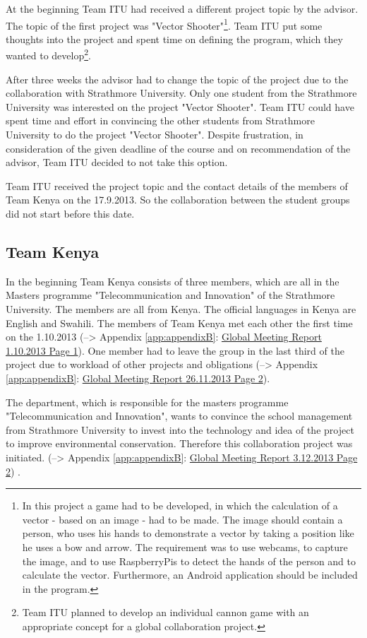 At the beginning Team ITU had received a different project topic by the advisor. The topic of the first project was "Vector Shooter"\footnote{In this project a game had to be developed, in which the calculation of a vector - based on an image - had to be made. The image should contain a person, who uses his hands to demonstrate a vector by taking a position like he uses a bow and arrow. The requirement was to use webcams, to capture the image, and to use RaspberryPis to detect the hands of the person and to calculate the vector. Furthermore, an Android application should be included in the program.}. Team ITU put some thoughts into the project and spent time on defining the program, which they wanted to develop\footnote{Team ITU planned to develop an individual cannon game with an appropriate concept for a global collaboration project.}.

After three weeks the advisor had to change the topic of the project due to the collaboration with Strathmore University. Only one student from the Strathmore University was interested on the project "Vector Shooter". Team ITU could have spent time and effort in convincing the other students from Strathmore University to do the project "Vector Shooter". Despite frustration, in consideration of the given deadline of the course and on recommendation of the advisor, Team ITU decided to not take this option.

Team ITU received the project topic and the contact details of the members of Team Kenya on the 17.9.2013. So the collaboration between the student groups did not start before this date.


\subsection{Team Kenya}

In the beginning Team Kenya consists of three members, which are all in the Masters programme "Telecommunication and Innovation" of the Strathmore University. The members are all from Kenya. The official languages in Kenya are English and Swahili. The members of Team Kenya met each other the first time on the 1.10.2013 (--> Appendix \ref{app:appendixB}: \hyperlink{GSD20131001.1}{Global Meeting Report 1.10.2013 Page 1}). One member had to leave the group in the last third of the project due to workload of other projects and obligations (--> Appendix \ref{app:appendixB}: \hyperlink{GSD20131126.2}{Global Meeting Report 26.11.2013 Page 2}).

The department, which is responsible for the masters programme "Telecommunication and Innovation", wants to convince the school management from Strathmore University to invest into the technology and idea of the project to improve environmental conservation. Therefore this collaboration project was initiated. (--> Appendix \ref{app:appendixB}: \hyperlink{GSD20131203.2}{Global Meeting Report 3.12.2013 Page 2}) .

